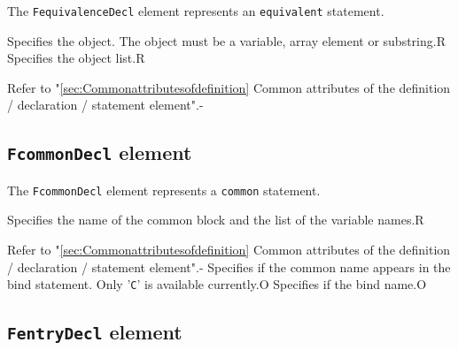 The {\tt FequivalenceDecl} element represents an {\tt equivalent} statement.


\begin{XcodeMLChildElements}
{Specifies the object. The object must be a variable, array element or substring.}{R}
{Specifies the object list.}{R}
\end{XcodeMLChildElements}

\begin{XcodeMLAttributes}
{Refer to "\ref{sec:Commonattributesofdefinition} Common attributes of the definition / declaration / statement element".}{-}
\end{XcodeMLAttributes}


\subsection{ {\tt FcommonDecl} element}

The {\tt FcommonDecl} element represents a {\tt common} statement.


\begin{XcodeMLChildElements}
{Specifies the name of the common block and the list of the variable names.}{R}
\end{XcodeMLChildElements}

\begin{XcodeMLAttributes}
{Refer to "\ref{sec:Commonattributesofdefinition} Common attributes of the definition / declaration / statement element".}{-}
{Specifies if the common name appears in the bind statement. Only '{\tt C}' is available currently.}{O}
{Specifies if the bind name.}{O}
\end{XcodeMLAttributes}


\subsection{ {\tt FentryDecl} element}

